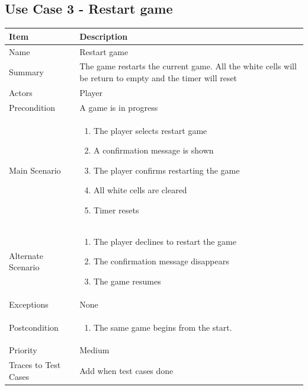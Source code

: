 \documentclass[12pt]{article}
\begin{document}
\newpage


\subsection{Use Case 3 - Restart game}

\begin{center}
\setlength{\tabcolsep}{18pt}
\renewcommand{\arraystretch}{1.3}
\begin{tabular}{ |p{3.4cm}|p{10cm}| }
    \hline
    
   \textbf{Item} & \textbf{Description} \\
    \hline
    Name & Restart game \\
    \hline
    Summary & The game restarts the current game. All the white cells will be return to empty and the timer will reset \\
    \hline
    Actors & Player \\
    \hline
    Precondition & A game is in progress \\
    \hline
    Main Scenario &     
    \vspace*{-0.1in}
    \begin{enumerate}[leftmargin=0.2in]
    \item The player selects restart game
    \item A confirmation message is shown
    \item The player confirms restarting the game
    \item All white cells are cleared
    \item Timer resets
    \end{enumerate}  \\
    \hline
    Alternate Scenario & \vspace*{-0.1in}
    \begin{enumerate}[leftmargin=0.2in]
    \item The player declines to restart the game
    \item The confirmation message disappears
    \item The game resumes
    \end{enumerate}  \\
    \hline
    Exceptions &  None\\
    \hline
    Postcondition & 
    \vspace*{-0.1in}
    \begin{enumerate}[leftmargin=0.2in]
        \item The same game begins from the start.
    \end{enumerate}  \\
    \hline
    Priority & Medium  \\
    \hline
    \small{Traces to Test Cases} & Add when test cases done  \\
    \hline
\end{tabular}
\end{center}
\end{document}
